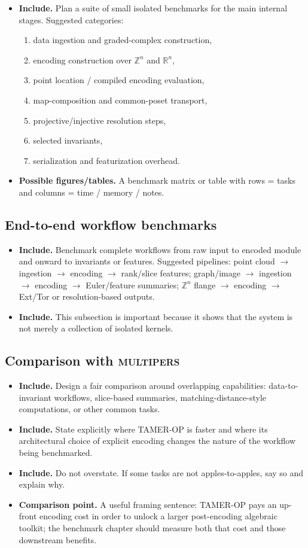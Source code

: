 \documentclass[11pt]{article}
\newcommand{\R}{\mathbb{R}}
\newcommand{\Z}{\mathbb{Z}}
\newcommand{\TAMER}{\textsc{TAMER-OP}}
\newcommand{\multipers}{\textsc{multipers}}
\newenvironment{plan}{\begin{itemize}[leftmargin=1.6em,itemsep=0.35em,topsep=0.25em]}{\end{itemize}}
\newcommand{\includeitems}[1]{\item \textbf{Include.} #1}
\newcommand{\figures}[1]{\item \textbf{Possible figures/tables.} #1}
\newcommand{\compare}[1]{\item \textbf{Comparison point.} #1}
\begin{document}
\begin{plan}
    \includeitems{Plan a suite of small isolated benchmarks for the main internal stages. Suggested categories:
    \begin{enumerate}[label=(\alph*)]
        \item data ingestion and graded-complex construction,
        \item encoding construction over $\Z^n$ and $\R^n$,
        \item point location / compiled encoding evaluation,
        \item map-composition and common-poset transport,
        \item projective/injective resolution steps,
        \item selected invariants,
        \item serialization and featurization overhead.
    \end{enumerate}}
    \figures{A benchmark matrix or table with rows = tasks and columns = time / memory / notes.}
\end{plan}

\subsection{End-to-end workflow benchmarks}

\begin{plan}
    \includeitems{Benchmark complete workflows from raw input to encoded module and onward to invariants or features. Suggested pipelines: point cloud $\to$ ingestion $\to$ encoding $\to$ rank/slice features; graph/image $\to$ ingestion $\to$ encoding $\to$ Euler/feature summaries; $\mathbb{Z}^n$ flange $\to$ encoding $\to$ Ext/Tor or resolution-based outputs.}
    \includeitems{This subsection is important because it shows that the system is not merely a collection of isolated kernels.}
\end{plan}

\subsection{Comparison with \multipers{}}

\begin{plan}
    \includeitems{Design a fair comparison around overlapping capabilities: data-to-invariant workflows, slice-based summaries, matching-distance-style computations, or other common tasks.}
    \includeitems{State explicitly where \TAMER{} is faster and where its architectural choice of explicit encoding changes the nature of the workflow being benchmarked.}
    \includeitems{Do not overstate. If some tasks are not apples-to-apples, say so and explain why.}
    \compare{A useful framing sentence: \TAMER{} pays an up-front encoding cost in order to unlock a larger post-encoding algebraic toolkit; the benchmark chapter should measure both that cost and those downstream benefits.}
\end{plan}
\end{document}
